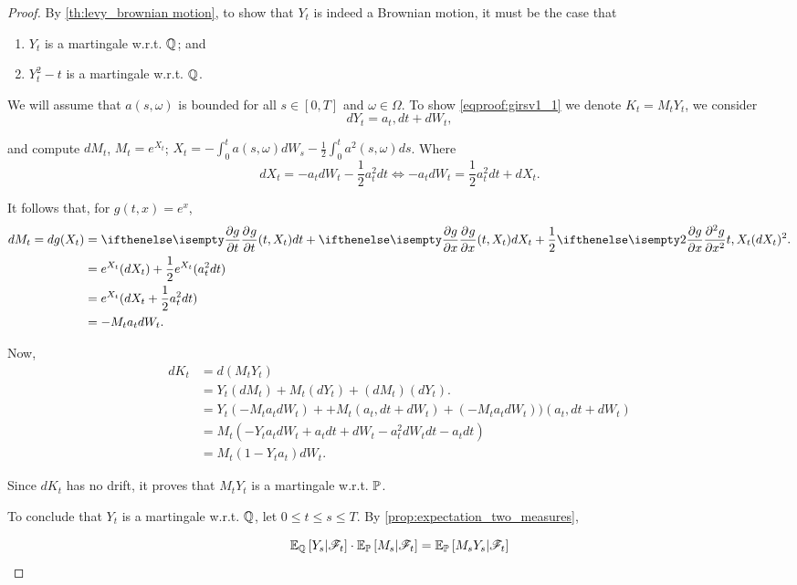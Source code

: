 \documentclass[../TGMAFFIRO.tex]{subfiles}
\begin{document}
\begin{proof}
By \ref{th:levy_brownian motion}, to show that $Y_t$ is indeed a Brownian motion, it must be the case that
\begin{enumerate}
	\item $Y_t$ is a martingale w.r.t. $\mathbb{Q}$; and \label{eqproof:girsv1_1}
	\item $Y_t^2 - t$ is a martingale w.r.t. $\mathbb{Q}$. \label{eqproof:girsv1_2}
\end{enumerate}

We will assume that $a(s,\omega)$ is bounded for all $s\in[0,T]$ and $\omega\in\Omega$. To show \ref{eqproof:girsv1_1} we denote $K_t = M_t Y_t$, we consider
\[
	dY_t = a_t, dt + dW_t,
\]

and compute $dM_t$, $M_t = e^{X_t}$; $X_t = -\int_0^t a(s,\omega) dW_s - \frac{1}{2}\int_0^t a^2(s,\omega) ds$. Where
\begin{equation}
  dX_t = -a_t dW_t - \frac{1}{2}a^2_t dt \iff -a_tdW_t = \frac{1}{2}a^2_tdt + dX_t.
\end{equation}

It follows that, for $g(t, x) = e^x$,
\begin{align}
	dM_t = dg(X_t) &= \partialwrt{g}{t}{(t, X_t)} dt + \partialwrt{g}{x}{(t, X_t)} dX_t + \frac{1}{2}\partialwrt[2]{g}{x}{t, X_t} (dX_t)^2. \nonumber \\
	&= e^{X_t} (dX_t) + \frac{1}{2}e^{X_t}(a^2_t dt) \nonumber \\
	&= e^{X_t}(dX_t + \frac{1}{2}a^2_t dt) \nonumber \\
	&= -M_ta_tdW_t.
\end{align}

Now,
\begin{align}
	dK_t &= d(M_tY_t)\nonumber \\
		&= Y_t(dM_t) + M_t(dY_t) + (dM_t)(dY_t). \nonumber\\
		&= Y_t(-M_ta_tdW_t) + + M_t(a_t, dt + dW_t) + (-M_ta_tdW_t))(a_t, dt + dW_t)\nonumber \\
		&= M_t(-Y_t a_t dW_t + a_t dt + dW_t - a^2_tdW_tdt - a_t dt) \nonumber \\
		&= M_t(1 - Y_t a_t)dW_t.
\end{align}

Since $dK_t$ has no drift, it proves that $M_tY_t$ is a martingale w.r.t. $\mathbb{P}$.

To conclude that $Y_t$ is a martingale w.r.t. $\mathbb{Q}$, let $0 \leq t \leq s \leq T$. By \ref{prop:expectation_two_measures},

\[
	\mathbb{E}_{\mathbb{Q}}\left[Y_s|\mathscr{F}_t\right] \cdot \mathbb{E}_{\mathbb{P}}\left[M_s|\mathscr{F}_t\right] = \mathbb{E}_{\mathbb{P}}\left[M_sY_s|\mathscr{F}_t\right]
\]


\end{proof}
\end{document}
